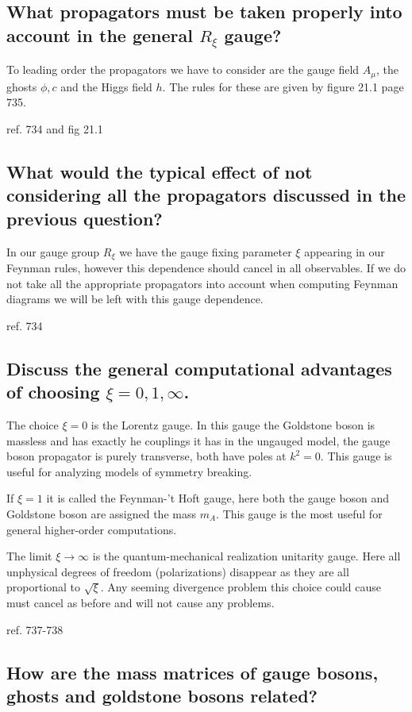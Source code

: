 \documentclass[paper=a4, fontsize=11pt]{scrartcl} %
\numberwithin{equation}{section} %
\numberwithin{figure}{section} %
\numberwithin{table}{section} %
\begin{document}
\subsection*{What propagators must be taken properly into account in the general $R_{\xi}$ gauge?}

To leading order the propagators we have to consider are the gauge field $A_{\mu}$, the ghosts $\phi, c$ and the Higgs field $h$. The rules for these are given by figure 21.1 page 735. 

ref. 734 and fig 21.1

\subsection*{What would the typical effect of not considering all the propagators discussed in the previous question?}

In our gauge group $R_{\xi}$ we have the gauge fixing parameter $\xi$ appearing in our Feynman rules, however this dependence should cancel in all observables. If we do not take all the appropriate propagators into account when computing Feynman diagrams we will be left with this gauge dependence. 

ref. 734

\subsection*{Discuss the general computational advantages of choosing $\xi = 0 , 1, \infty$.}

The choice $\xi = 0$ is the Lorentz gauge. In this gauge the Goldstone boson is massless and has exactly he couplings it has in the ungauged model, the gauge boson propagator is purely transverse, both have poles at $k^2 = 0 $. This gauge is useful for analyzing models of symmetry breaking. 

If $\xi = 1$ it is called the Feynman-'t Hoft gauge, here both the gauge boson and Goldstone boson are assigned the mass $m_A$. This gauge is the most useful for general higher-order computations. 

The limit $\xi \rightarrow \infty$ is the quantum-mechanical realization unitarity gauge. Here all unphysical degrees of freedom (polarizations) disappear as they are all proportional to $\sqrt{\xi}$. Any seeming divergence problem this choice could cause must cancel as before and will not cause any problems.

ref. 737-738

\subsection*{How are the mass matrices of gauge bosons, ghosts and goldstone bosons related?}
\end{document}
